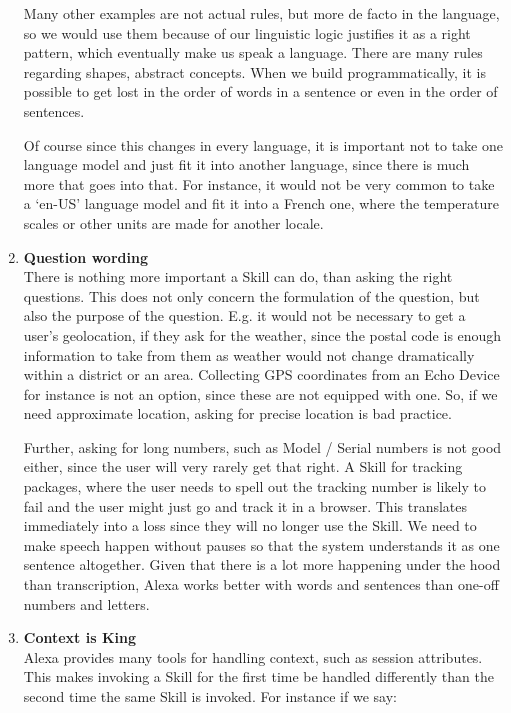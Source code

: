\begin{enumerate}
Many other examples are not actual rules, but more de facto	in the language, so we would use them because of our linguistic logic justifies it as a right pattern, which eventually make us speak a language. There are many rules regarding shapes, abstract concepts. When we build programmatically, it is possible to get lost in the order of words in a sentence or even in the order of sentences.

Of course since this changes in every language, it is important not to take one language model and just fit it into another language, since there is much more that goes into that. For instance, it would not be very common to take a `en-US' language model and fit it into a French one, where the temperature scales or other units are made for another locale.


\item \textbf{Question wording}\\
There is nothing more important a Skill can do, than asking the right questions. This does not only concern the formulation of the question, but also the purpose of the question. E.g. it would not be necessary to get a user's geolocation, if they ask for the weather, since the postal code is enough information to take from them as weather would not change dramatically within a district or an area. Collecting GPS coordinates from an Echo Device for instance is not an option, since these are not equipped with one. So, if we need approximate location, asking for precise location is bad practice.

Further, asking for long numbers, such as Model / Serial numbers is not good either, since the user will very rarely get that right. A Skill for tracking packages, where the user needs to spell out the tracking number is likely to fail and the user might just go and track it in a browser. This translates immediately into a loss since they will no longer use the Skill. We need to make speech happen without pauses so that the system understands it as one sentence altogether. Given that there is a lot more happening under the hood than transcription, Alexa works better with words and sentences than one-off numbers and letters. 

\item \textbf{Context is King}\\
Alexa provides many tools for handling context, such as session attributes. This makes invoking a Skill for the first time be handled differently than the second time the same Skill is invoked. For instance if we say:




\end{enumerate}
